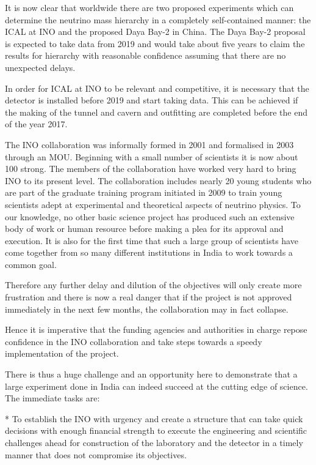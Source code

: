 \documentclass[12pt]{article}
\begin{document}
It is now clear that worldwide there are two proposed experiments which
can determine the neutrino mass hierarchy in a completely self-contained
manner: the ICAL at INO and the proposed Daya Bay-2 in China. The Daya
Bay-2 proposal is expected to take data from 2019 and would take about
five years to claim the results for hierarchy with reasonable confidence
assuming that there are no unexpected delays.

In order for ICAL at INO to be relevant and competitive, it is necessary
that the detector is installed before 2019 and start taking data. This
can be achieved if the making of the tunnel and cavern and outfitting
are completed before the end of the year 2017.

The INO collaboration was informally formed in 2001 and formalised in 2003
through an MOU. Beginning with a small number of scientists it is now
about 100 strong. The members of the collaboration have worked very hard
to bring INO to its present level. The collaboration includes nearly 20
young students who are part of the graduate training program initiated in
2009 to train young scientists adept at experimental and theoretical
aspects of neutrino physics. To our knowledge, no other basic science
project has produced such an extensive body of work or human resource
before making a plea for its approval and execution. It is also
for the first time that such a large group of scientists have come
together from so many different institutions in India to work towards
a common goal.

Therefore any further delay and dilution of the objectives will only
create more frustration and there is now a real danger that if the project
is not approved immediately in the next few months, the collaboration may
in fact collapse.

Hence it is imperative that the funding agencies and authorities in charge
repose confidence in the INO collaboration and take steps towards a speedy
implementation of the project.

There is thus a huge challenge and an opportunity here to demonstrate that
a large experiment done in India can indeed succeed at the cutting edge of
science. The immediate tasks are:

* To establish the INO with urgency and create a structure that can take
quick decisions with enough financial strength to execute the engineering
and scientific challenges ahead for construction of the laboratory and the
detector in a timely manner that does not compromise its objectives.
\end{document}
